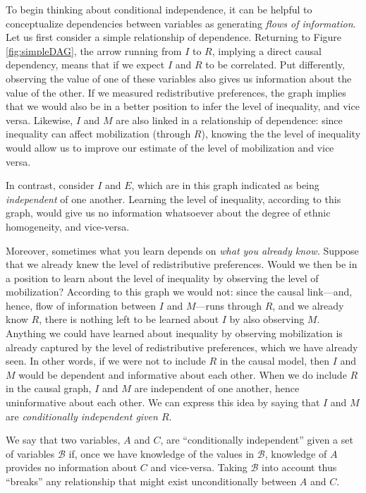 \documentclass[12pt,]{book}
\begin{document}
To begin thinking about conditional independence, it can be helpful to conceptualize dependencies between variables as generating \emph{flows of information}. Let us first consider a simple relationship of dependence. Returning to Figure \ref{fig:simpleDAG}, the arrow running from \(I\) to \(R\), implying a direct causal dependency, means that if we expect \(I\) and \(R\) to be correlated. Put differently, observing the value of one of these variables also gives us information about the value of the other. If we measured redistributive preferences, the graph implies that we would also be in a better position to infer the level of inequality, and vice versa. Likewise, \(I\) and \(M\) are also linked in a relationship of dependence: since inequality can affect mobilization (through \(R\)), knowing the the level of inequality would allow us to improve our estimate of the level of mobilization and vice versa.

In contrast, consider \(I\) and \(E\), which are in this graph indicated as being \emph{independent} of one another. Learning the level of inequality, according to this graph, would give us no information whatsoever about the degree of ethnic homogeneity, and vice-versa.

Moreover, sometimes what you learn depends on \emph{what you already know.} Suppose that we already knew the level of redistributive preferences. Would we then be in a position to learn about the level of inequality by observing the level of mobilization? According to this graph we would not: since the causal link---and, hence, flow of information between \(I\) and \(M\)---runs through \(R\), and we already know \(R\), there is nothing left to be learned about \(I\) by also observing \(M\). Anything we could have learned about inequality by observing mobilization is already captured by the level of redistributive preferences, which we have already seen. In other words, if we were not to include \(R\) in the causal model, then \(I\) and \(M\) would be dependent and informative about each other. When we do include \(R\) in the causal graph, \(I\) and \(M\) are independent of one another, hence uninformative about each other. We can express this idea by saying that \(I\) and \(M\) are \emph{conditionally independent given \(R\)}.

We say that two variables, \(A\) and \(C\), are ``conditionally independent'' given a set of variables \(\mathcal B\) if, once we have knowledge of the values in \(\mathcal B\), knowledge of \(A\) provides no information about \(C\) and vice-versa. Taking \(\mathcal B\) into account thus ``breaks'' any relationship that might exist unconditionally between \(A\) and \(C\).
\end{document}
